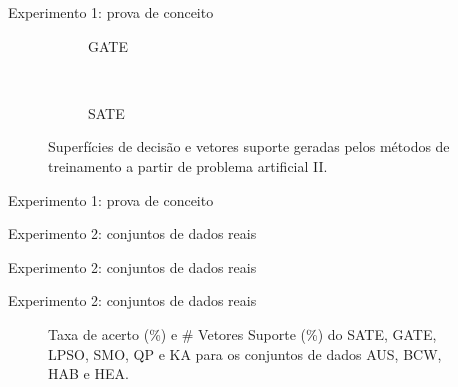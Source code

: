\documentclass{beamer}
\newcommand\infe{\textcolor{gray}{\ding{55}}}
\newcommand\equi{\ding{51}}
\newcommand{\tabela}[3]{
\begin{table}[!htbp]
  \scalefont{#3}
  \begin{center}
  \caption{#2}\label{tab:#1}
    
  \end{center}
\end{table}
}
\begin{document}
\begin{frame}[noframenumbering]{Experimento 1: prova de conceito}
\begin{figure}[H]
    \begin{center}  
      \begin{subfigure}[b]{.40\textwidth}
        \caption{GATE}
      \end{subfigure}
      ~
      \begin{subfigure}[b]{.40\textwidth}
        \caption{SATE}
      \end{subfigure}
      
    \end{center}
    \caption{Superfícies de decisão e vetores suporte geradas pelos métodos de treinamento a partir de problema artificial II.}\label{fig:simulacoes-pa-i-resultados}
\end{figure}
\end{frame}


\begin{frame}[noframenumbering]{Experimento 1: prova de conceito}

\end{frame}

\begin{frame}{Experimento 2: conjuntos de dados reais}
\end{frame}

\begin{frame}[noframenumbering]{Experimento 2: conjuntos de dados reais}
\end{frame}

\begin{frame}[noframenumbering]{Experimento 2: conjuntos de dados reais}
  \begin{figure}[!htbp]
    \centering
    \caption{Taxa de acerto (\%) e \# Vetores Suporte (\%) do SATE, GATE, LPSO, SMO, QP e KA para os conjuntos de dados AUS, BCW, HAB e HEA.}\label{fig:accuracy_training_patterns}
  \end{figure}
\end{frame}
\end{document}
